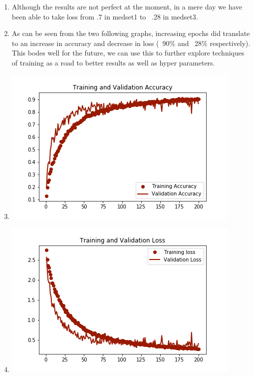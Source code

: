 \documentclass[12pt]{article} %
\begin{document}
\begin{enumerate}[label = (\roman*)]
\item Although the results are not perfect at the moment, in a mere day we have been able to take loss from .7 in medset1 to ~.28 in medset3.
\item As can be seen from the two following graphs, increasing epochs did translate to an increase in accuracy and decrease in loss (~90\% and ~28\% respectively). This bodes well for the future, we can use this to further explore techniques of training as a road to better results as well as hyper parameters.
\item \includegraphics{train-vs-val-acc-medset3}
\item \includegraphics{train-vs-val-loss-medset3}
\end{enumerate}
\end{document}
